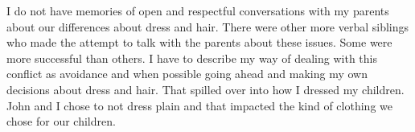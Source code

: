 I do not have memories of open and respectful conversations with my parents about our differences about dress and hair.
There were other more verbal siblings who made the attempt to talk with the parents about these issues.
Some were more successful than others.
I have to describe my way of dealing with this conflict as avoidance and when possible going ahead and making my own decisions about dress and hair.
That spilled over into how I dressed my children.
John and I chose to not dress plain and that impacted the kind of clothing we chose for our children.





